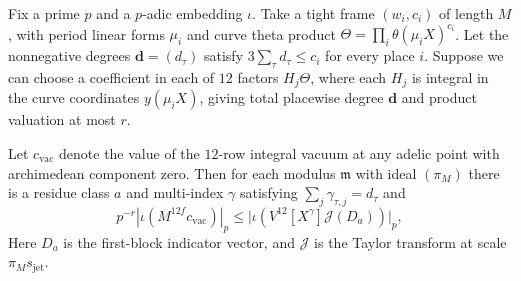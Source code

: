 \begin{lemma}
\label{lem:c-derivative-indicator}
\emitthmsource
Fix a prime $p$ and a $p$-adic embedding $\iota$. Take a tight frame $(w_i,c_i)$ of length $M$, with period linear forms $\mu_i$ and curve theta product $\Theta=\prod_i\theta(\mu_i X)^{c_i}$. Let the nonnegative degrees $\boldsymbol d=(d_\tau)$ satisfy $3\sum_\tau d_\tau\le c_i$ for every place $i$. Suppose we can choose a coefficient in each of $12$ factors $H_j\Theta$, where each $H_j$ is integral in the curve coordinates $y(\mu_i X)$, giving total placewise degree $\boldsymbol d$ and product valuation at most $r$.

Let $c_{\mathrm{vac}}$ denote the value of the $12$-row integral vacuum at any adelic point with archimedean component zero. Then for each modulus $\mathfrak m$ with ideal $(\pi_M)$ there is a residue class $a$ and multi-index $\gamma$ satisfying $\sum_j\gamma_{\tau,j}=d_\tau$ and
\[
  p^{-r}|\iota(M^{12f}c_{\mathrm{vac}})|_p
      \le \bigl|\iota(V^{12}[X^\gamma]\mathcal J(D_a))\bigr|_p ,
\]
Here $D_a$ is the first-block indicator vector, and $\mathcal J$ is the Taylor transform at scale $\pi_M s_{\mathrm{jet}}$.
\end{lemma}

